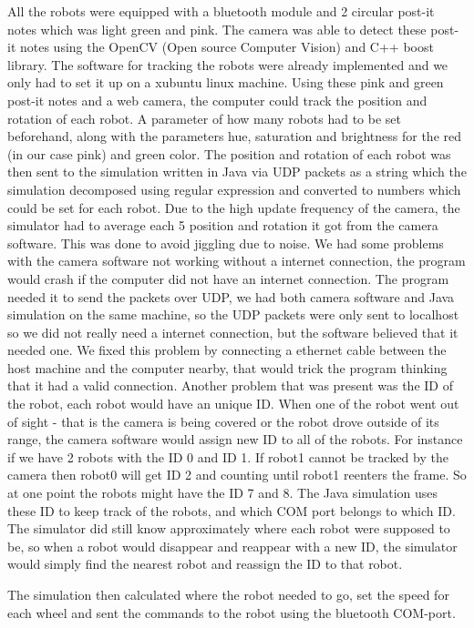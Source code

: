 All the robots were equipped with a bluetooth module and 2 circular post-it notes which was light green and pink.
The camera was able to detect these post-it notes using the OpenCV (Open source Computer Vision) and C++ boost library. The software for tracking the robots were already implemented and we only had to set it up on a xubuntu linux machine.
Using these pink and green post-it notes and a web camera, the computer could track the position and rotation of each robot. A parameter of how many robots had to be set beforehand, along with the parameters hue, saturation and brightness for the red (in our case pink) and green color. 
The position and rotation of each robot was then sent to the simulation written in Java via UDP packets as a string which the simulation decomposed using regular expression and converted to numbers which could be set for each robot. Due to the high update frequency of the camera, the simulator had to average each 5 position and rotation it got from the camera software. This was done to avoid jiggling due to noise. We had some problems with the camera software not working without a internet connection, the program would crash if the computer did not have an internet connection. The program needed it to send the packets over UDP, we had both camera software and Java simulation on the same machine, so the UDP packets were only sent to localhost so we did not really need a internet connection, but the software believed that it needed one. We fixed this problem by connecting a ethernet cable between the host machine and the computer nearby, that would trick the program thinking that it had a valid connection.
Another problem that was present was the ID of the robot, each robot would have an unique ID. When one of the robot went out of sight - that is the camera is being covered or the robot drove outside of its range, the camera software would assign new ID to all of the robots. For instance if we have 2 robots with the ID 0 and ID 1. If robot1 cannot be tracked by the camera then robot0 will get ID 2 and counting until robot1 reenters the frame. So at one point the robots might have the ID 7 and 8. The Java simulation uses these ID to keep track of the robots, and which COM port belongs to which ID. The simulator did still know approximately where each robot were supposed to be, so when a robot would disappear and reappear with a new ID, the simulator would simply find the nearest robot and reassign the ID to that robot.


The simulation then calculated where the robot needed to go, set the speed for each wheel and sent the commands to the robot using the bluetooth COM-port.

